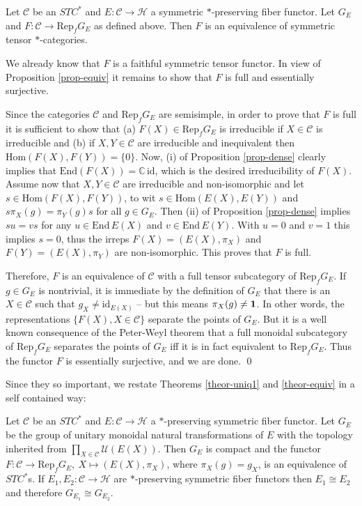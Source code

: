 \documentclass[11pt]{article}
\theoremstyle{definition}
\theoremstyle{definition}
\theoremstyle{remark}
\def\2#1{{\mathcal #1}}
\def\7#1{{\mathbb #1}}
\def\1#1{{\bf #1}}
\newcommand{\Hom}{\mathrm{Hom}}
\newcommand{\End}{\mathrm{End}}
\newcommand{\Rep}{\mathrm{Rep}}
\newcommand{\rarr}{\rightarrow}
\def\id{\mathrm{id}}
\begin{document}
\btheor \label{theor-equiv}
Let $\2C$ be an $STC^*$ and $E:\2C\rarr\2H$ a symmetric $*$-preserving fiber functor. Let $G_E$ and 
$F:\2C\rarr\Rep_fG_E$ as defined above. Then $F$ is an equivalence of symmetric tensor
$*$-categories. 
\etheor

\prf We already know that $F$ is a faithful symmetric tensor functor. In view of Proposition
\ref{prop-equiv} it remains to show that $F$ is full and essentially surjective. 

Since the categories $\2C$ and $\Rep_fG_E$ are semisimple, in order to prove that $F$ is full it is
sufficient to show that (a) $F(X)\in\Rep_fG_E$ is irreducible if $X\in\2C$ is irreducible and (b)
if $X,Y\in\2C$ are irreducible and inequivalent then $\Hom(F(X),F(Y))=\{0\}$. Now, (i) of
Proposition \ref{prop-dense} clearly implies that $\End(F(X))=\7C\,\id$, which is the desired
irreducibility of $F(X)$. Assume now that $X,Y\in\2C$ are irreducible and non-isomorphic and let 
$s\in\Hom(F(X),F(Y))$, to wit $s\in\Hom(E(X),E(Y))$ and $s\pi_X(g)=\pi_Y(g)s$ for all $g\in G_E$. 
Then (ii) of Proposition \ref{prop-dense} implies $su=vs$ for any $u\in\End\,E(X)$ and
$v\in\End\,E(Y)$. With $u=0$ and $v=1$ this implies $s=0$, thus the irreps $F(X)=(E(X),\pi_X)$ and
$F(Y)=(E(X),\pi_Y)$ are non-isomorphic. This proves that $F$ is full.

Therefore, $F$ is an equivalence of $\2C$ with a full tensor subcategory of $\Rep_fG_E$. If 
$g\in G_E$ is nontrivial, it is immediate by the definition of $G_E$ that there is an $X\in\2C$ such
that $g_X\ne\id_{E(X)}$ -- but this means $\pi_X(g)\ne\11$. In other words, the representations 
$\{F(X), X\in\2C\}$ separate the points of $G_E$. But it is a well known consequence of the
Peter-Weyl theorem that a full monoidal subcategory of $\Rep_fG_E$ separates the points of $G_E$ iff
it is in fact equivalent to $\Rep_fG_E$. Thus the functor $F$ is essentially surjective, and we are
done. 
\qed

Since they so important, we restate Theorems \ref{theor-uniq1} and \ref{theor-equiv} in a self
contained way:

\btheor \label{theor-T2} 
Let $\2C$ be an $STC^*$ and $E: \2C\rarr\2H$ a $*$-preserving symmetric fiber functor. Let $G_E$ be 
the group of unitary monoidal natural transformations of $E$ with the topology inherited from 
$\prod_{X\in\2C}\2U(E(X))$. Then $G_E$ is compact and the functor 
$F: \2C\rarr\Rep_fG_E,\ X\mapsto(E(X),\pi_X)$, where $\pi_X(g)=g_X$, is an equivalence of $STC^*$s. 
If $E_1,E_2: \2C\rarr\2H$ are $*$-preserving symmetric fiber functors then $E_1\cong E_2$ and
therefore $G_{E_1}\cong G_{E_2}$.
\etheor
\end{document}
